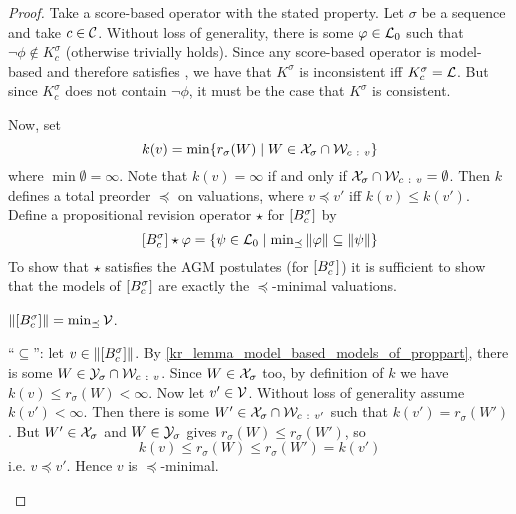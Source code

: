 \begin{proof}
    Take a score-based operator with the stated property. Let $\sigma$ be a
    sequence and take $c \in \mathcal{C}$. Without loss of generality, there is some
    $\varphi \in \mathcal{L}{}_0$ such that $\neg\phi \notin K^\sigma_c$ (otherwise \agm{}
    trivially holds). Since any score-based operator is model-based and
    therefore satisfies \closure{}, we have that $K^\sigma$ is inconsistent iff
    $K^\sigma_c = \mathcal{L}{}$. But since $K^\sigma_c$ does not contain $\neg\phi$,
    it must be the case that $K^\sigma$ is consistent.

    Now, set
    \[
        k(v)
        = \min\{
            r_\sigma(W)
            \mid
            W \in \mathcal{X}_\sigma \cap \mathcal{W}_{c\ :\ v}
        \}
    \]
    where $\min\emptyset =  \infty$. Note that $k(v) = \infty$ if and only if
    $\mathcal{X}_\sigma \cap \mathcal{W}_{c\ :\  v} = \emptyset$. Then $k$ defines a total
    preorder $\preceq$ on valuations, where $v \preceq v'$ iff $k(v) \le
    k(v')$. Define a propositional revision operator $\star$ for
    $\left[{B^\sigma_c}\right]$ by
    \[
        \left[{B^\sigma_c}\right] \star \varphi = \{
            \psi \in \mathcal{L}{}_0
            \mid
            \min\nolimits_{\preceq}{\|{\varphi}\|} \subseteq \|{\psi}\|
        \}
    \]
    To show that $\star$ satisfies the AGM postulates (for
    $\left[{B^\sigma_c}\right]$) it is sufficient to show that the models of
    $\left[{B^\sigma_c}\right]$ are exactly the $\preceq$-minimal valuations.

        \begin{claim}
            $\|{\left[{B^\sigma_c}\right]}\| = \min_{\preceq}{\mathcal{V}}$.
        \end{claim}
        \begin{claimproof}

            ``$\subseteq$'': let $v \in \|{\left[{B^\sigma_c}\right]}\|$. By
            \cref{kr_lemma_model_based_models_of_proppart}, there is some $W \in
            \mathcal{Y}_\sigma \cap \mathcal{W}_{c\ :\  v}$. Since $W \in \mathcal{X}_\sigma$ too, by
            definition of $k$ we have $k(v) \le r_\sigma(W) < \infty$. Now let
            $v' \in \mathcal{V}$. Without loss of generality assume $k(v') < \infty$.
            Then there is some $W' \in \mathcal{X}_\sigma \cap \mathcal{W}_{c\ :\  v'}$ such that
            $k(v') = r_\sigma(W')$. But $W' \in \mathcal{X}_\sigma$ and $W \in
            \mathcal{Y}_\sigma$ gives $r_\sigma(W) \le r_\sigma(W')$, so
            \[
                k(v) \le r_\sigma(W) \le r_\sigma(W') = k(v')
            \]
            i.e. $v \preceq v'$. Hence $v$ is $\preceq$-minimal.


\end{claimproof}
\end{proof}
